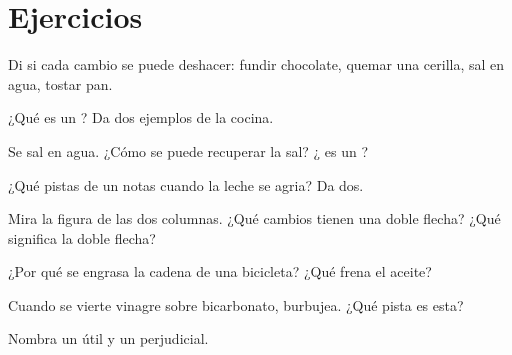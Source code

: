 \section{Ejercicios}

\begin{exercise}[$\star$]\label{exo:g5:irreversible-changes:1}
Di si cada cambio se puede deshacer: fundir chocolate, quemar una
cerilla,  sal en agua, tostar pan.
\end{exercise}

\begin{exercise}[$\star$]\label{exo:g5:irreversible-changes:2}
¿Qué es un ? Da dos ejemplos de la cocina.
\end{exercise}

\begin{exercise}[$\star$]\label{exo:g5:irreversible-changes:3}
Se  sal en agua. ¿Cómo se puede recuperar la sal? ¿ es
un ?
\end{exercise}

\begin{exercise}[$\star$]\label{exo:g5:irreversible-changes:4}
¿Qué pistas de un  notas cuando la leche se agria? Da
dos.
\end{exercise}

\begin{exercise}[$\star$]\label{exo:g5:irreversible-changes:5}
Mira la figura de las dos columnas. ¿Qué cambios tienen una doble
flecha? ¿Qué significa la doble flecha?
\end{exercise}

\begin{exercise}[$\star$]\label{exo:g5:irreversible-changes:6}
¿Por qué se engrasa la cadena de una bicicleta? ¿Qué 
frena el aceite?
\end{exercise}

\begin{exercise}[$\star$]\label{exo:g5:irreversible-changes:7}
Cuando se vierte vinagre sobre bicarbonato, burbujea. ¿Qué pista es
esta?
\end{exercise}

\begin{exercise}[$\star$]\label{exo:g5:irreversible-changes:8}
Nombra un  útil y un  perjudicial.
\end{exercise}

